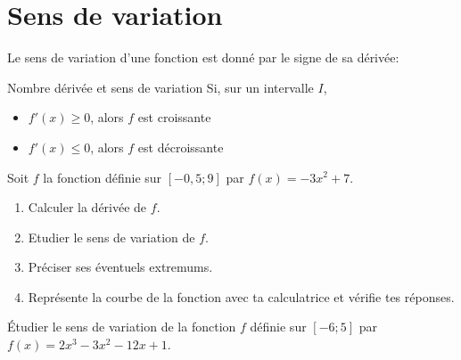 \documentclass[10pt,a4paper,openany,twoside, eleve]{book}
\begin{document}
\newpage

\section{Sens de variation}

Le sens de variation d'une fonction est donné par le signe de sa dérivée:
\begin{prop}{Nombre dérivée et sens de variation}{}
  Si, sur un intervalle $I$,
  \begin{itemize}
    \item $f'(x)\geqslant0$, alors $f$ est croissante
    \item $f'(x)\leqslant0$, alors $f$ est décroissante
  \end{itemize}
\end{prop}

\begin{dem}{}{}
\end{dem}

\begin{exon}
  Soit $f$ la fonction définie sur $[-0,5;9]$
  par $f(x)= -3x^2+7$.
  \begin{enumerate}
    \item Calculer la dérivée de $f$.
    \item Etudier le sens de variation de $f$.
    \item Préciser ses éventuels extremums.
    \item Représente la courbe de la fonction avec ta calculatrice et vérifie tes réponses.
  \end{enumerate}
    
  \vspace{4mm}
  \noindent{}
\end{exon}

\begin{exon}
  \'Etudier le sens de variation de la fonction $f$ définie
  sur $[-6;5]$ par
  $f(x)=2x^3-3x^2-12x+1$.
    
  \vspace{4mm}
  \noindent{}
\end{exon}
\end{document}
